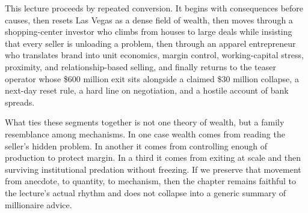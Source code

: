 This lecture proceeds by repeated conversion. It begins with consequences before causes, then resets Las Vegas as a dense field of wealth, then moves through a shopping-center investor who climbs from houses to large deals while insisting that every seller is unloading a problem, then through an apparel entrepreneur who translates brand into unit economics, margin control, working-capital stress, proximity, and relationship-based selling, and finally returns to the teaser operator whose \$600 million exit sits alongside a claimed \$30 million collapse, a next-day reset rule, a hard line on negotiation, and a hostile account of bank spreads.

What ties these segments together is not one theory of wealth, but a family resemblance among mechanisms. In one case wealth comes from reading the seller's hidden problem. In another it comes from controlling enough of production to protect margin. In a third it comes from exiting at scale and then surviving institutional predation without freezing. If we preserve that movement from anecdote, to quantity, to mechanism, then the chapter remains faithful to the lecture's actual rhythm and does not collapse into a generic summary of millionaire advice.